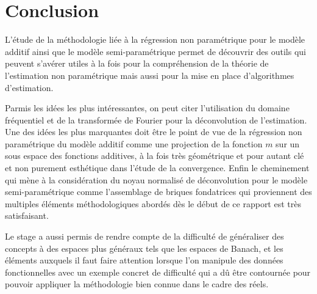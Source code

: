 \documentclass[11pt]{report}
\begin{document}




% 
\chapter{Conclusion}

L'étude de la méthodologie liée à la régression non paramétrique pour le modèle additif ainsi que le modèle semi-paramétrique permet de découvrir des outils qui peuvent s'avérer utiles à la fois pour la compréhension de la théorie de l'estimation non paramétrique mais aussi pour la mise en place d'algorithmes d'estimation. 

\bigskip

Parmis les idées les plus intéressantes, on peut citer l'utilisation du domaine fréquentiel et de la transformée de Fourier pour la déconvolution de l'estimation. Une des idées les plus marquantes doit être le point de vue de la régression non paramétrique du modèle additif comme une projection de la fonction $m$ sur un sous espace des fonctions additives, à la fois très géométrique et pour autant clé et non purement esthétique dans l'étude de la convergence. Enfin le cheminement qui mène à la considération du noyau normalisé de déconvolution pour le modèle semi-paramétrique comme l'assemblage de briques fondatrices qui proviennent des multiples éléments méthodologiques abordés dès le début de ce rapport est très satisfaisant.

\bigskip

Le stage a aussi permis de rendre compte de la difficulté de généraliser des concepts à des espaces plus généraux tels que les espaces de Banach, et les éléments auxquels il faut faire attention lorsque l'on manipule des données fonctionnelles avec un exemple concret de difficulté qui a dû être contournée pour pouvoir appliquer la méthodologie bien connue dans le cadre des réels.

\appendix
{}


\typeout{}

\end{document}
